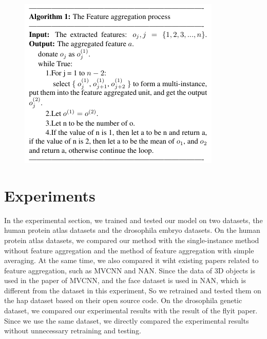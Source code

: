 \documentclass[10pt,twocolumn,letterpaper]{article}
\begin{document}
\begin{figure}[t]
\begin{center}
  \includegraphics[width=1.0\linewidth]{algorithm.png}
\end{center}
\label{fig:long}
\label{fig:onecol}
\end{figure}


\section{Experiments}
In the experimental section, we trained and tested our model on two datasets, the human protein atlas datasets and the drosophila embryo datasets. On the human protein atlas datasets, we compared our method with the single-instance method without feature aggregation and the method of feature aggregation with simple averaging. At the same time, we also compared it wiht existing papers related to feature aggregation, such as MVCNN and NAN. Since the data of 3D objects is used in the paper of MVCNN, and the face dataset is used in NAN, which is different from the dataset in this experiment, So we retrained and tested them on the hap dataset based on their open source code. On the drosophila genetic dataset, we compared our experimental results with the result of the flyit paper. Since we use the same dataset, we directly compared the experimental results without unnecessary retraining and testing.
\end{document}
